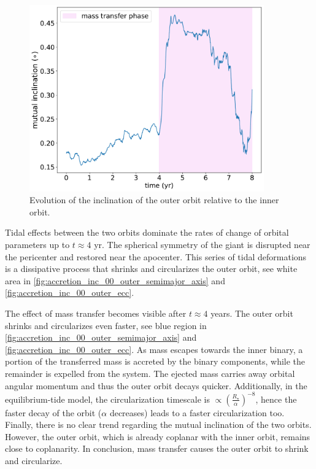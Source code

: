 \begin{figure}[H]
    \centering
    \includegraphics[width=0.9\textwidth]{Thesis/graphs/inc_00/accretion_inc_00_inc.pdf}
    \caption{Evolution of the inclination of the outer orbit relative to the inner orbit.}
    \label{fig:accretion_inc_00_inc}
\end{figure}

Tidal effects between the two orbits dominate the rates of change of orbital parameters up to $t \approx 4$ yr. The spherical symmetry of the giant is disrupted near the pericenter and restored near the apocenter. This series of tidal deformations is a dissipative process that shrinks and circularizes the outer orbit, see white area in \cref{fig:accretion_inc_00_outer_semimajor_axis} and \cref{fig:accretion_inc_00_outer_ecc}.

The effect of mass transfer becomes visible after $t \approx 4$ years. The outer orbit shrinks and circularizes even faster, see blue region in \cref{fig:accretion_inc_00_outer_semimajor_axis} and \cref{fig:accretion_inc_00_outer_ecc}. As mass escapes towards the inner binary, a portion of the transferred mass is accreted by the binary components, while the remainder is expelled from the system. The ejected mass carries away orbital angular momentum and thus the outer orbit decays quicker. Additionally, in the equilibrium-tide model, the circularization timescale is $\propto (\frac{R_{\star}}{\alpha})^{-8}$, hence the faster decay of the orbit ($\alpha$ decreases) leads to a faster circularization too. Finally, there is no clear trend regarding the mutual inclination of the two orbits. However, the outer orbit, which is already coplanar with the inner orbit, remains close to coplanarity. In conclusion,  mass transfer causes the outer orbit to shrink and circularize.

